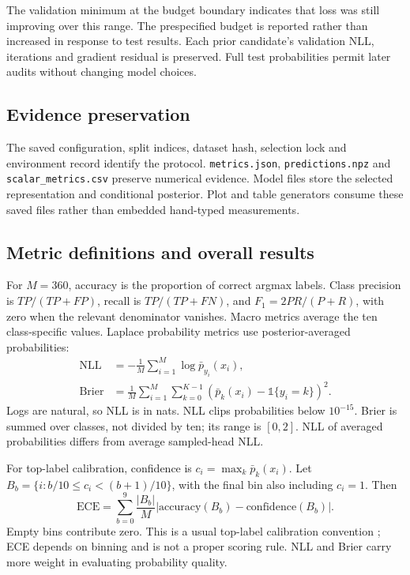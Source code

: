 \documentclass[10pt,a4paper]{article}
\begin{document}
\begin{table}[H]\centering
\caption{Choices locked before full-run test predictions. All feature checkpoints
were selected at epoch 120. Laplace chose $\alpha=1$ for every seed.
Gaussian NB selected smoothing 0.1.}
\end{table}
The validation minimum at the budget boundary indicates that loss was still
improving over this range. The prespecified budget is reported rather than
increased in response to test results. Each prior candidate's validation NLL,
iterations and gradient residual is preserved. Full test probabilities permit
later audits without changing model choices.

\subsection{Evidence preservation}
The saved configuration, split indices, dataset hash, selection lock
and environment record identify the protocol.
\texttt{metrics.json}, \texttt{predictions.npz} and
\texttt{scalar\_metrics.csv} preserve numerical evidence.
Model files store the selected representation and conditional posterior.
Plot and table generators consume these saved files rather than embedded
hand-typed measurements.


\subsection{Metric definitions and overall results}
For $M=360$, accuracy is the proportion of correct argmax labels.
Class precision is $TP/(TP+FP)$, recall is $TP/(TP+FN)$, and
$F_1=2PR/(P+R)$, with zero when the relevant denominator vanishes.
Macro metrics average the ten class-specific values.
Laplace probability metrics use posterior-averaged probabilities:
\begin{align}
\mathrm{NLL}&=-\frac1M\sum_{i=1}^M\log \bar p_{y_i}(x_i),\\
\mathrm{Brier}&=\frac1M\sum_{i=1}^M\sum_{k=0}^{K-1}
(\bar p_k(x_i)-\mathbb{1}\{y_i=k\})^2.
\end{align}
Logs are natural, so NLL is in nats. NLL clips probabilities below $10^{-15}$.
Brier is summed over classes, not divided by ten; its range is $[0,2]$.
NLL of averaged probabilities differs from average sampled-head NLL.

For top-label calibration, confidence is $c_i=\max_k\bar p_k(x_i)$.
Let $B_b=\{i:b/10\leq c_i<(b+1)/10\}$, with the final bin also including $c_i=1$.
Then
\begin{equation}
\mathrm{ECE}=\sum_{b=0}^{9}\frac{|B_b|}{M}
|\mathrm{accuracy}(B_b)-\mathrm{confidence}(B_b)|.
\end{equation}
Empty bins contribute zero. This is a usual top-label calibration convention
\cite{guo}; ECE depends on binning and is not a proper scoring rule. NLL and
Brier carry more weight in evaluating probability quality.
\end{document}
